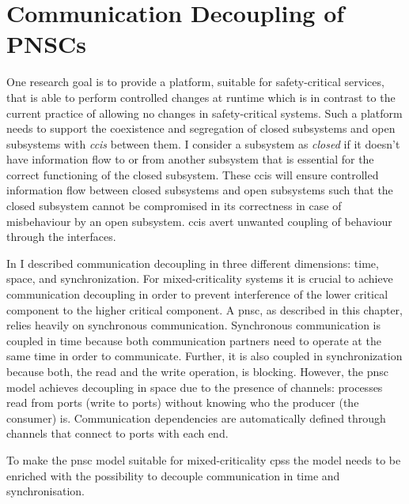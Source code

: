 \section{Communication Decoupling of PNSCs}
\label{sect_cci_decoupling}
One research goal is to provide a platform, suitable for safety-critical services, that is able to perform controlled changes at runtime which is in contrast to the current practice of allowing no changes in safety-critical systems.
Such a platform needs to support the coexistence and segregation of closed subsystems and open subsystems with \emph{\glspl{cci}} between them.
I consider a subsystem as {\em closed} if it doesn't have information flow to or from another subsystem that is essential for the correct functioning of the closed subsystem.
These \glspl{cci} will ensure controlled information flow between closed subsystems and open subsystems such that the closed subsystem cannot be compromised in its correctness in case of misbehaviour by an open subsystem.
\Glspl{cci} avert unwanted coupling of behaviour through the interfaces.

In \Sect{\ref{sect_background_com}} I described communication decoupling in three different dimensions: time, space, and synchronization.
For mixed-criticality systems it is crucial to achieve communication decoupling in order to prevent interference of the lower critical component to the higher critical component.
A \gls{pnsc}, as described in this chapter, relies heavily on synchronous communication.
Synchronous communication is coupled in time because both communication partners need to operate at the same time in order to communicate.
Further, it is also coupled in synchronization because both, the read and the write operation, is blocking.
However, the \gls{pnsc} model achieves decoupling in space due to the presence of channels: processes read from ports (write to ports) without knowing who the producer (the consumer) is.
Communication dependencies are automatically defined through channels that connect to ports with each end.

To make the \gls{pnsc} model suitable for mixed-criticality \glspl{cps} the model needs to be enriched with the possibility to decouple communication in time and synchronisation.%

